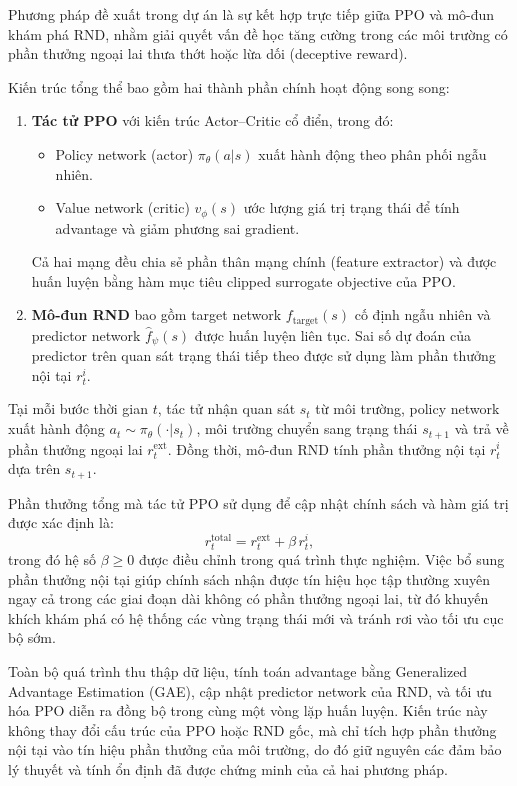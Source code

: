 \documentclass{uetgraduation}
\begin{document}
Phương pháp đề xuất trong dự án là sự kết hợp trực tiếp giữa PPO và mô-đun khám phá RND, nhằm giải quyết vấn đề học tăng cường trong các môi trường có phần thưởng ngoại lai thưa thớt hoặc lừa dối (deceptive reward).

Kiến trúc tổng thể bao gồm hai thành phần chính hoạt động song song:

\begin{enumerate}
    \item \textbf{Tác tử PPO} với kiến trúc Actor–Critic cổ điển, trong đó:
    \begin{itemize}
        \item Policy network (actor) $\pi_\theta(a|s)$ xuất hành động theo phân phối ngẫu nhiên.
        \item Value network (critic) $v_\phi(s)$ ước lượng giá trị trạng thái để tính advantage và giảm phương sai gradient.
    \end{itemize}
    Cả hai mạng đều chia sẻ phần thân mạng chính (feature extractor) và được huấn luyện bằng hàm mục tiêu clipped surrogate objective của PPO.

    \item \textbf{Mô-đun RND} bao gồm target network $f_{\text{target}}(s)$ cố định ngẫu nhiên và predictor network $\hat{f}_\psi(s)$ được huấn luyện liên tục. Sai số dự đoán của predictor trên quan sát trạng thái tiếp theo được sử dụng làm phần thưởng nội tại $r_t^i$.
\end{enumerate}

Tại mỗi bước thời gian $t$, tác tử nhận quan sát $s_t$ từ môi trường, policy network xuất hành động $a_t \sim \pi_\theta(\cdot|s_t)$, môi trường chuyển sang trạng thái $s_{t+1}$ và trả về phần thưởng ngoại lai $r_t^{\text{ext}}$. Đồng thời, mô-đun RND tính phần thưởng nội tại $r_t^i$ dựa trên $s_{t+1}$.

Phần thưởng tổng mà tác tử PPO sử dụng để cập nhật chính sách và hàm giá trị được xác định là:
\[
r_t^{\text{total}} = r_t^{\text{ext}} + \beta \, r_t^i,
\]
trong đó hệ số $\beta \geq 0$ được điều chỉnh trong quá trình thực nghiệm. Việc bổ sung phần thưởng nội tại giúp chính sách nhận được tín hiệu học tập thường xuyên ngay cả trong các giai đoạn dài không có phần thưởng ngoại lai, từ đó khuyến khích khám phá có hệ thống các vùng trạng thái mới và tránh rơi vào tối ưu cục bộ sớm.

Toàn bộ quá trình thu thập dữ liệu, tính toán advantage bằng Generalized Advantage Estimation (GAE), cập nhật predictor network của RND, và tối ưu hóa PPO diễn ra đồng bộ trong cùng một vòng lặp huấn luyện. Kiến trúc này không thay đổi cấu trúc của PPO hoặc RND gốc, mà chỉ tích hợp phần thưởng nội tại vào tín hiệu phần thưởng của môi trường, do đó giữ nguyên các đảm bảo lý thuyết và tính ổn định đã được chứng minh của cả hai phương pháp.
\end{document}
